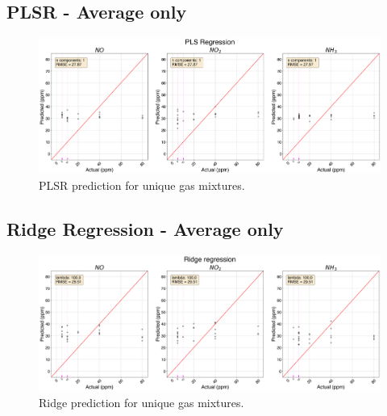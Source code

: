 \newpage
\subsection{PLSR - Average only}

\begin{figure}[h]
	\centering
	\includegraphics[width=1\textwidth]{../figures/plsr-avg-only.png}
	\caption{PLSR prediction for unique gas mixtures.}
	\label{fig:plsr-avg-only}
\end{figure}

\newpage
\subsection{Ridge Regression - Average only}

\begin{figure}[h]
	\centering
	\includegraphics[width=1\textwidth]{../figures/ridge-avg-only.png}
	\caption{Ridge prediction for unique gas mixtures.}
	\label{fig:ridge-avg-only}
\end{figure}


